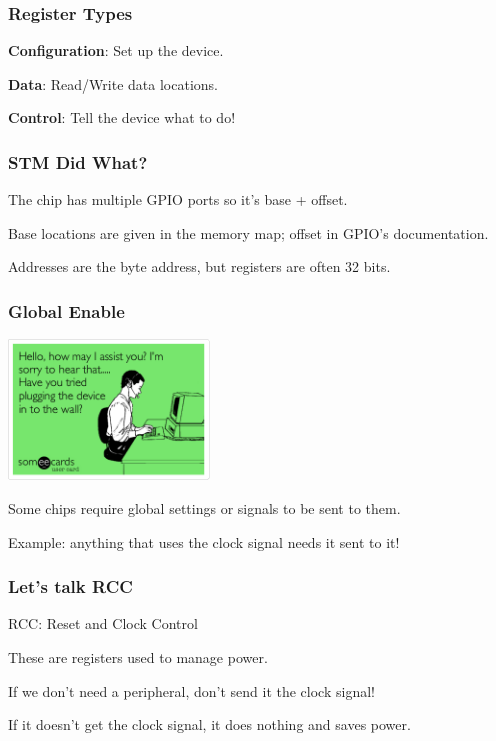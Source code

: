 \begin{frame}
\frametitle{Register Types}

\textbf{Configuration}: Set up the device.

\textbf{Data}: Read/Write data locations.

\textbf{Control}: Tell the device what to do!

\end{frame}


\begin{frame}
\frametitle{STM Did What?}

The chip has multiple GPIO ports so it's base + offset.

Base locations are given in the memory map; offset in GPIO's documentation.

Addresses are the byte address, but registers are often 32 bits.

\end{frame}




\begin{frame}
\frametitle{Global Enable}


\begin{center}
	\includegraphics[width=0.4\textwidth]{images/plugin.png}
\end{center}

Some chips require global settings or signals to be sent to them.

Example: anything that uses the clock signal needs it sent to it!

\end{frame}


\begin{frame}
\frametitle{Let's talk RCC}

\alert{RCC}: Reset and Clock Control

These are registers used to manage power.

If we don't need a peripheral, don't send it the clock signal!

If it doesn't get the clock signal, it does nothing and saves power.


\end{frame}


